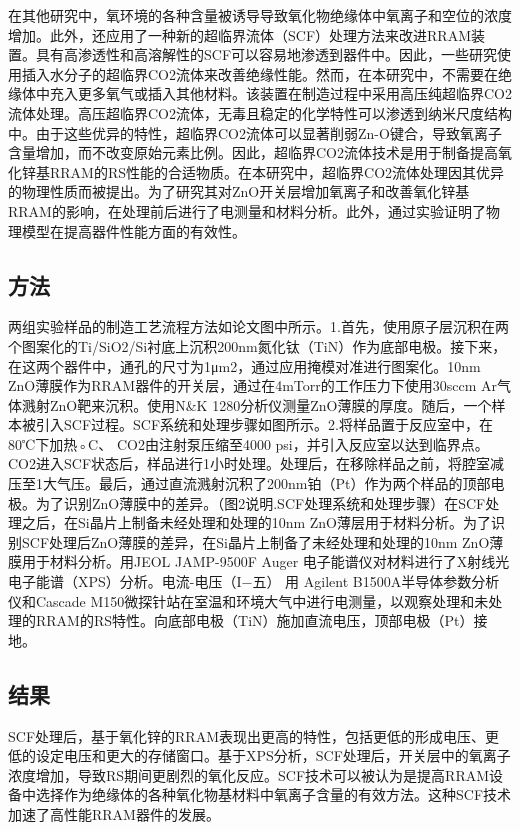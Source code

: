 在其他研究中，氧环境的各种含量被诱导导致氧化物绝缘体中氧离子和空位的浓度增加。此外，还应用了一种新的超临界流体（SCF）处理方法来改进RRAM装置。具有高渗透性和高溶解性的SCF可以容易地渗透到器件中。因此，一些研究使用插入水分子的超临界CO2流体来改善绝缘性能。然而，在本研究中，不需要在绝缘体中充入更多氧气或插入其他材料。该装置在制造过程中采用高压纯超临界CO2流体处理。高压超临界CO2流体，无毒且稳定的化学特性可以渗透到纳米尺度结构中。由于这些优异的特性，超临界CO2流体可以显著削弱Zn-O键合，导致氧离子含量增加，而不改变原始元素比例。因此，超临界CO2流体技术是用于制备提高氧化锌基RRAM的RS性能的合适物质。在本研究中，超临界CO2流体处理因其优异的物理性质而被提出。为了研究其对ZnO开关层增加氧离子和改善氧化锌基RRAM的影响，在处理前后进行了电测量和材料分析。此外，通过实验证明了物理模型在提高器件性能方面的有效性。


\subsection{方法}

两组实验样品的制造工艺流程方法如论文图中所示。1.首先，使用原子层沉积在两个图案化的Ti/SiO2/Si衬底上沉积200nm氮化钛（TiN）作为底部电极。接下来，在这两个器件中，通孔的尺寸为1μm2，通过应用掩模对准进行图案化。10nm ZnO薄膜作为RRAM器件的开关层，通过在4mTorr的工作压力下使用30sccm Ar气体溅射ZnO靶来沉积。使用N\&K 1280分析仪测量ZnO薄膜的厚度。随后，一个样本被引入SCF过程。SCF系统和处理步骤如图所示。2.将样品置于反应室中，在80℃下加热◦C、 CO2由注射泵压缩至4000 psi，并引入反应室以达到临界点。CO2进入SCF状态后，样品进行1小时处理。处理后，在移除样品之前，将腔室减压至1大气压。最后，通过直流溅射沉积了200nm铂（Pt）作为两个样品的顶部电极。为了识别ZnO薄膜中的差异。（图2说明.SCF处理系统和处理步骤）在SCF处理之后，在Si晶片上制备未经处理和处理的10nm ZnO薄层用于材料分析。为了识别SCF处理后ZnO薄膜的差异，在Si晶片上制备了未经处理和处理的10nm ZnO薄膜用于材料分析。用JEOL JAMP-9500F Auger 电子能谱仪对材料进行了X射线光电子能谱（XPS）分析。电流-电压（I−五） 用 Agilent B1500A半导体参数分析仪和Cascade M150微探针站在室温和环境大气中进行电测量，以观察处理和未处理的RRAM的RS特性。向底部电极（TiN）施加直流电压，顶部电极（Pt）接地。

\subsection{结果}

SCF处理后，基于氧化锌的RRAM表现出更高的特性，包括更低的形成电压、更低的设定电压和更大的存储窗口。基于XPS分析，SCF处理后，开关层中的氧离子浓度增加，导致RS期间更剧烈的氧化反应。SCF技术可以被认为是提高RRAM设备中选择作为绝缘体的各种氧化物基材料中氧离子含量的有效方法。这种SCF技术加速了高性能RRAM器件的发展。

